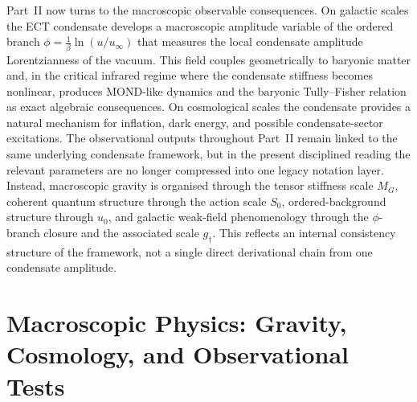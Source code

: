 \documentclass[11pt,a4paper]{article}
\numberwithin{equation}{section}
\begin{document}
Part~II now turns to the macroscopic observable consequences.
On galactic scales the ECT condensate develops a macroscopic amplitude
variable of the ordered branch
$\phi=\frac{1}{\beta}\ln(u/u_\infty)$ that measures the local condensate amplitude
Lorentzianness of the vacuum.  This field couples geometrically to
baryonic matter and, in the critical infrared regime where the condensate
stiffness becomes nonlinear, produces MOND-like dynamics and the
baryonic Tully--Fisher relation as exact algebraic consequences.
On cosmological scales the condensate provides a natural mechanism
for inflation, dark energy, and possible condensate-sector excitations.
The observational outputs throughout Part~II remain linked to the same
underlying condensate framework, but in the present disciplined reading
the relevant parameters are no longer compressed into one legacy
notation layer.
Instead, macroscopic gravity is organised through the tensor stiffness
scale $M_G$, coherent quantum structure through the action scale $S_0$,
ordered-background structure through $u_0$, and galactic weak-field
phenomenology through the $\phi$-branch closure and the associated
scale $g_\dagger$.
This reflects an internal consistency structure of the framework,
not a single direct derivational chain from one condensate amplitude.



\label{sec:gravity}%
\label{sec:lorentz_order_field}%
\label{sec:galactic}%
\label{sec:cosmology}%
\label{sec:phi_first_strategy}%

\part{Macroscopic Physics: Gravity, Cosmology, and Observational Tests}
\label{part:macro}
\end{document}
